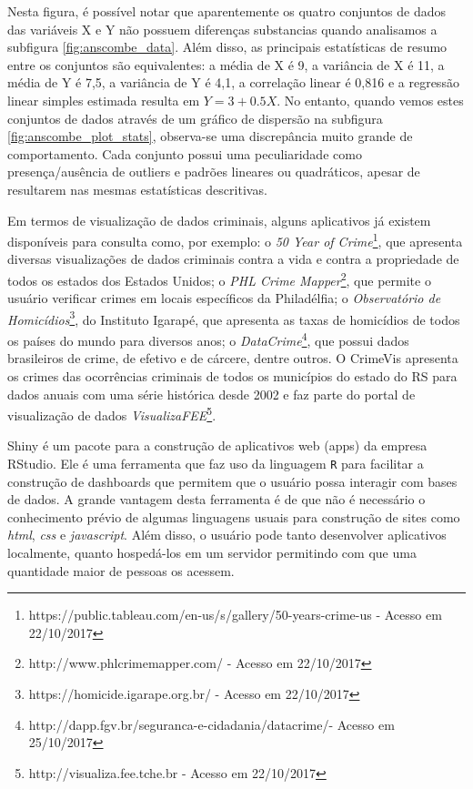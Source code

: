 \documentclass[12pt,openright,oneside,a4paper,english,french,spanish]{abntex2}
\numberwithin{table}{section} %
\numberwithin{figure}{section} %
\begin{document}
Nesta figura, é possível notar que aparentemente os quatro conjuntos de dados das variáveis X e Y não possuem diferenças substancias quando analisamos a subfigura \ref{fig:anscombe_data}. Além disso, as principais estatísticas de resumo entre os conjuntos são equivalentes: a média de X é 9, a variância de X é 11, a média de Y é 7,5, a variância de Y é 4,1, a correlação linear é 0,816 e a regressão linear simples estimada resulta em $Y = 3 + 0.5X$. No entanto, quando vemos estes conjuntos de dados através de um gráfico de dispersão na subfigura \ref{fig:anscombe_plot_stats}, observa-se uma discrepância muito grande de comportamento. Cada conjunto possui uma peculiaridade como presença/ausência de outliers e padrões lineares ou quadráticos, apesar de resultarem nas mesmas estatísticas descritivas.

Em termos de visualização de dados criminais, alguns aplicativos já existem disponíveis para consulta como, por exemplo: o \textit{50 Year of Crime}\footnote{https://public.tableau.com/en-us/s/gallery/50-years-crime-us - Acesso em 22/10/2017}, que apresenta diversas visualizações de dados criminais contra a vida e contra a propriedade de todos os estados dos Estados Unidos; o \textit{PHL Crime Mapper}\footnote{http://www.phlcrimemapper.com/ - Acesso em 22/10/2017}, que permite o usuário verificar crimes em locais específicos da Philadélfia; o \textit{Observatório de Homicídios}\footnote{https://homicide.igarape.org.br/ - Acesso em 22/10/2017}, do Instituto Igarapé, que apresenta as taxas de homicídios de todos os países do mundo para diversos anos; o \textit{DataCrime}\footnote{http://dapp.fgv.br/seguranca-e-cidadania/datacrime/- Acesso em 25/10/2017}, que possui dados brasileiros de crime, de efetivo e de cárcere, dentre outros. O CrimeVis apresenta os crimes das ocorrências criminais de todos os municípios do estado do RS para dados anuais com uma série histórica desde 2002 e faz parte do portal de visualização de dados \textit{VisualizaFEE}\footnote{http://visualiza.fee.tche.br - Acesso em 22/10/2017}.

Shiny \cite{shiny} é um pacote para a construção de aplicativos web (apps) da empresa RStudio. Ele é uma ferramenta que faz uso da linguagem \texttt{R} \cite{softwareR} para facilitar a construção de dashboards que permitem que o usuário possa interagir com bases de dados. A grande vantagem desta ferramenta é de que não é necessário o conhecimento prévio de algumas linguagens usuais para construção de sites como \textit{html}, \textit{css} e \textit{javascript}. Além disso, o usuário pode tanto desenvolver aplicativos localmente, quanto hospedá-los em um servidor permitindo com que uma quantidade maior de pessoas os acessem.
\end{document}
